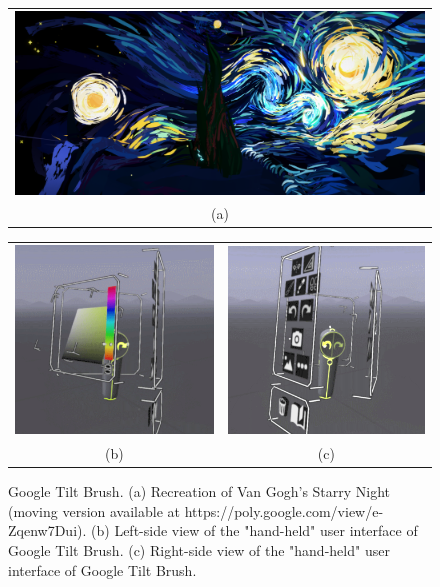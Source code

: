 \begin{figure}[!h]
    \centering
    \setlength{\tabcolsep}{0.0130\linewidth}
    \begin{tabular}{@{}c@{}}
    \includegraphics[width=0.7260\linewidth]{figures/TiltBrush_StarryNight}\\
    (a)
    \end{tabular}
    
    \centering
    \setlength{\tabcolsep}{0.0130\linewidth}
    \begin{tabular}{@{}cc@{}}
   	\includegraphics[width=0.35\linewidth]{figures/Tilt_menu2}&
    \includegraphics[width=0.35\linewidth]{figures/Tilt_menu1}\\
    (b)&(c)\\
    \end{tabular}
    \caption[Google Tilt Brush]{Google Tilt Brush.
    	  \textup{(a)} Recreation of Van Gogh's Starry Night (moving version available at https://poly.google.com/view/e-Zqenw7Dui).
			  \textup{(b)} Left-side view of the "hand-held" user interface of Google Tilt Brush. \textup{(c)} Right-side view of the "hand-held" user interface of Google Tilt Brush.
      \label{fig:tiltart}}
\end{figure}

